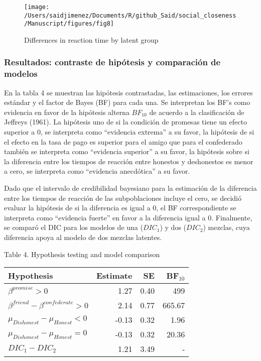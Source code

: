 \documentclass[]{article}
\begin{document}
\begin{figure}

{\centering \texttt{[image: /Users/saidjimenez/Documents/R/github\_Said/social\_closeness/Manuscript/figures/fig8]} 

}

\caption{Differences in reaction time by latent group}\label{fig:fig9}
\end{figure}

\subsubsection{Resultados: contraste de hipótesis y comparación de
modelos}\label{resultados-contraste-de-hipotesis-y-comparacion-de-modelos}

En la tabla 4 se muestran las hipótesis contrastadas, las estimaciones,
los errores estándar y el factor de Bayes (BF) para cada una. Se
interpretan los BF's como evidencia en favor de la hipótesis alterna
\(BF_{10}\) de acuerdo a la clasificación de Jeffreys (1961). La
hipótesis uno de si la condición de promesas tiene un efecto superior a
0, se interpreta como ``evidencia extrema'' a su favor, la hipótesis de
si el efecto en la tasa de pago es superior para el amigo que para el
confederado también se interpreta como ``evidencia superior'' a su
favor, la hipótesis sobre si la diferencia entre los tiempos de reacción
entre honestos y deshonestos es menor a cero, se interpreta como
``evidencia anecdótica'' a su favor.

Dado que el intervalo de credibilidad bayesiano para la estimación de la
diferencia entre los tiempos de reacción de las subpoblaciones incluye
el cero, se decidió evaluar la hipótesis de si la diferencia es igual a
0, el BF correspondiente se interpreta como ``evidencia fuerte'' en
favor a la diferencia igual a 0. Finalmente, se comparó el DIC para los
modelos de una (\(DIC_{1}\)) y dos (\(DIC_{2}\)) mezclas, cuya
diferencia apoya al modelo de dos mezclas latentes.

Table 4. Hypothesis testing and model comparison

\begin{longtable}[]{@{}lrrr@{}}
\toprule
Hypothesis & Estimate & SE & BF\(_{10}\)\tabularnewline
\midrule
\endhead
\(\beta^{promise} > 0\) & 1.27 & 0.40 & 499\tabularnewline
\(\beta^{friend} - \beta^{confederate} > 0\) & 2.14 & 0.77 &
665.67\tabularnewline
\(\mu_{Dishonest} - \mu_{Honest} < 0\) & -0.13 & 0.32 &
1.96\tabularnewline
\(\mu_{Dishonest} - \mu_{Honest} = 0\) & -0.13 & 0.32 &
20.36\tabularnewline
\(DIC_{1} - DIC_{2}\) & 1.21 & 3.49 & -\tabularnewline
\bottomrule
\end{longtable}
\end{document}
